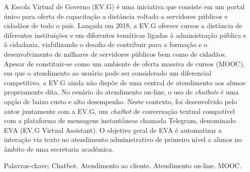 %
%
%
%

\setlength{\absparsep}{18pt} %
\begin{resumo}
A Escola Virtual de Governo (EV.G) é uma iniciativa que consiste em um portal único para oferta de capacitação a distância voltado a servidores públicos e cidadãos de todo o país.
Lançada em 2018, a EV.G oferece cursos a distância de diferentes instituições e em diferentes temáticas ligadas à administração pública e à cidadania, viabilizando o desafio de contribuir para a formação e o desenvolvimento de milhares de servidores públicos bem como de cidadãos.
Apesar de constituir-se como um ambiente de oferta massiva de cursos (MOOC), em que o atendimento ao usuário pode ser considerado um diferencial competitivo, a EV.G ainda não dispõe de uma central de atendimento aos alunos propriamente dita.
No cenário do atendimento on-line, o uso de \textit{chatbots} é uma opção de baixo custo e alto desempenho. 
Neste contexto, foi desenvolvido pelo autor juntamente com a EV.G, um \textit{chatbot} de conversação textual compatível com a plataforma de mensagens instantâneas chamada Telegram, denominado EVA (EV.G Virtual Assistant). O objetivo geral de EVA é automatizar a interação via texto no atendimento administrativo de primeiro nível a alunos no âmbito de uma secretaria acadêmica.


  \noindent
  {Palavras-chave}: Chatbot. Atendimento ao cliente. Atendimento on-line. MOOC.
\end{resumo}
